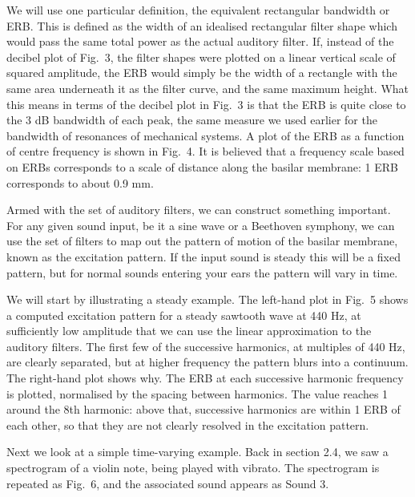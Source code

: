   We will use one particular definition, the equivalent rectangular bandwidth 
  or ERB. This is defined as the width of an idealised rectangular filter shape 
  which would pass the same total power as the actual auditory filter. If, 
  instead of the decibel plot of Fig.\ 3, the filter shapes were plotted on a 
  linear vertical scale of squared amplitude, the ERB would simply be the width 
  of a rectangle with the same area underneath it as the filter curve, and the 
  same maximum height. What this means in terms of the decibel plot in Fig.\ 3 
  is that the ERB is quite close to the 3 dB bandwidth of each peak, the same 
  measure we used earlier for the bandwidth of resonances of mechanical 
  systems. A plot of the ERB as a function of centre frequency is shown in 
  Fig.\ 4. It is believed that a frequency scale based on ERBs corresponds to a 
  scale of distance along the basilar membrane: 1 ERB corresponds to about 0.9 
  mm. 


  Armed with the set of auditory filters, we can construct something important. 
  For any given sound input, be it a sine wave or a Beethoven symphony, we can 
  use the set of filters to map out the pattern of motion of the basilar 
  membrane, known as the excitation pattern. If the input sound is steady this 
  will be a fixed pattern, but for normal sounds entering your ears the pattern 
  will vary in time. 

  We will start by illustrating a steady example. The left-hand plot in Fig.\ 5 
  shows a computed excitation pattern for a steady sawtooth wave at 440 Hz, at 
  sufficiently low amplitude that we can use the linear approximation to the 
  auditory filters. The first few of the successive harmonics, at multiples of 
  440 Hz, are clearly separated, but at higher frequency the pattern blurs into 
  a continuum. The right-hand plot shows why. The ERB at each successive 
  harmonic frequency is plotted, normalised by the spacing between harmonics. 
  The value reaches 1 around the 8th harmonic: above that, successive harmonics 
  are within 1 ERB of each other, so that they are not clearly resolved in the 
  excitation pattern. 



  Next we look at a simple time-varying example. Back in section 2.4, we saw a 
  spectrogram of a violin note, being played with vibrato. The spectrogram is 
  repeated as Fig.\ 6, and the associated sound appears as Sound 3. 

